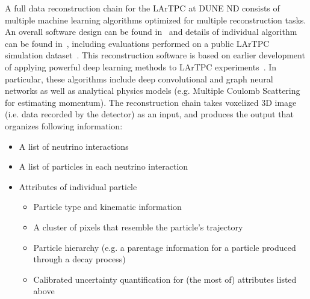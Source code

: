 \documentclass[../main-v1.tex]{subfiles}
\begin{document}
A full data reconstruction chain for the LArTPC at DUNE ND consists of multiple machine learning algorithms optimized for multiple reconstruction tasks. An overall software design can be found in~\cite{Drielsma:2021jdv} and details of individual algorithm can be found in~\cite{Domine:2019zhm,Domine:2020tlx,DeepLearnPhysics:2020hut,Koh:2020snv,NeutrinoUQ}, including evaluations performed on a public LArTPC simulation dataset~\cite{Adams:2020vlj}. This reconstruction software is based on earlier development of applying powerful deep learning methods to LArTPC experiments~\cite{Acciarri:2016ryt,Radovic:2018dip,Adams:2018bvi}. In particular, these algorithms include deep convolutional and graph neural networks as well as analytical physics models (e.g. Multiple Coulomb Scattering for estimating momentum). The reconstruction chain takes voxelized 3D image (i.e. data recorded by the detector) as an input, and produces the output that organizes following information:
\begin{itemize}
    \item A list of neutrino interactions
    \item A list of particles in each neutrino interaction
    \item Attributes of individual particle
    \begin{itemize}
        \item Particle type and kinematic information
        \item A cluster of pixels that resemble the particle's trajectory
        \item Particle hierarchy (e.g. a parentage information for a particle produced through a decay process)
        \item Calibrated uncertainty quantification for (the most of) attributes listed above
    \end{itemize}
\end{itemize}
\end{document}
